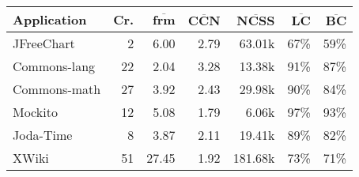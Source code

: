 \begin{tabular}{l rrrrrr}
\textbf{Application} & \textbf{Cr.} & $\overline{\mathbf{frm}}$ & $\overline{\mathbf{CCN}}$ & $\overline{\mathbf{NCSS}}$& $\overline{\mathbf{LC}}$ & $\overline{\mathbf{BC}}$ \\ 
\hline 
JFreeChart            &   2 & 6.00 & 2.79 & 63.01k & 67\% & 59\% \\ 
Commons-lang    &   22 & 2.04 & 3.28 & 13.38k & 91\% & 87\% \\ 
Commons-math   &   27 & 3.92 & 2.43 & 29.98k & 90\% & 84\% \\ 
Mockito                 &   12 & 5.08 & 1.79 & 6.06k & 97\% & 93\% \\ 
Joda-Time            &   8 & 3.87 & 2.11 & 19.41k & 89\% & 82\% \\ 
XWiki                    &  51 & 27.45 & 1.92 & 181.68k & 73\% & 71\% \\ 
\end{tabular}